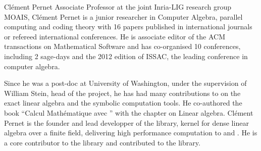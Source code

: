 \begin{participant}[type=leadPI,PM=15,salary=6500,gender=male]{Cl\'ement Pernet}
  Associate Professor at the joint Inria-LIG research group MOAIS, Cl\'ement Pernet is a
  junior researcher in Computer Algebra, parallel computing and coding theory with 16
  papers published in international journals or refereed international conferences. He is
  associate editor of the ACM transactions on Mathematical Software and has co-organised
  10 conferences, including 2 sage-days and the 2012 edition of ISSAC, the leading
  conference in computer algebra.

  Since he was a post-doc at University of Washington, under the supervision of William
  Stein, head of the \Sage project, he has had many contributions to \Sage on the exact
  linear algebra and the symbolic computation tools. He co-authored the book ``Calcul
  Mathématique avec \Sage'' with the chapter on Linear algebra.  Cl\'ement Pernet is the
  founder and lead developper of the  library, kernel for dense linear algebra
  over a finite field, delivering high performance computation to \Linbox and \Sage. He is a
  core contributor to the \Linbox library and contributed to the  library.






\end{participant}
